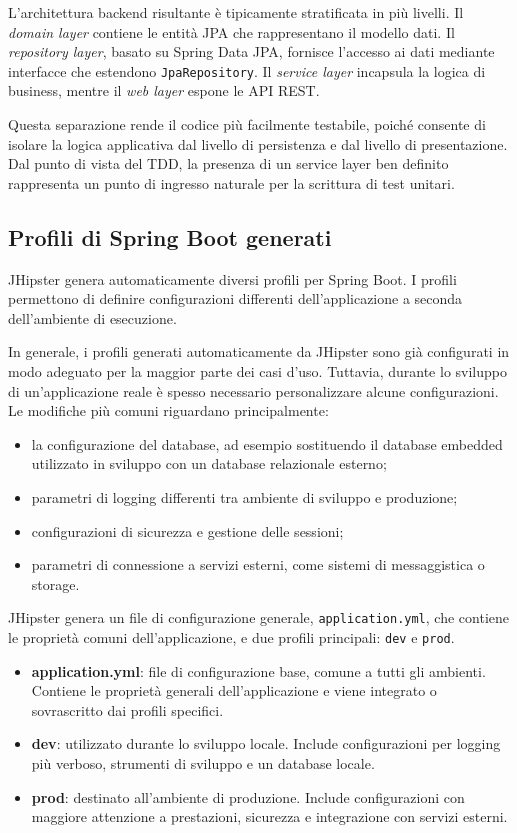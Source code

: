 L’architettura backend risultante è tipicamente stratificata in più livelli. Il \textit{domain layer} contiene le entità JPA che rappresentano il modello dati. Il \textit{repository layer}, basato su Spring Data JPA, fornisce l’accesso ai dati mediante interfacce che estendono \texttt{JpaRepository}. Il \textit{service layer} incapsula la logica di business, mentre il \textit{web layer} espone le API REST.

Questa separazione rende il codice più facilmente testabile, poiché consente di isolare la logica applicativa dal livello di persistenza e dal livello di presentazione. Dal punto di vista del TDD, la presenza di un service layer ben definito rappresenta un punto di ingresso naturale per la scrittura di test unitari.

\subsection{Profili di Spring Boot generati}
JHipster genera automaticamente diversi profili per Spring Boot. I profili permettono di definire configurazioni differenti dell’applicazione a seconda dell’ambiente di esecuzione.

In generale, i profili generati automaticamente da JHipster sono già configurati in modo adeguato per la maggior parte dei casi d’uso. Tuttavia, durante lo sviluppo di un’applicazione reale è spesso necessario personalizzare alcune configurazioni. Le modifiche più comuni riguardano principalmente:

\begin{itemize}
	\item la configurazione del database, ad esempio sostituendo il database embedded utilizzato in sviluppo con un database relazionale esterno;
	\item parametri di logging differenti tra ambiente di sviluppo e produzione;
	\item configurazioni di sicurezza e gestione delle sessioni;
	\item parametri di connessione a servizi esterni, come sistemi di messaggistica o storage.
\end{itemize}

JHipster genera un file di configurazione generale, \texttt{application.yml}, che contiene le proprietà comuni dell’applicazione, e due profili principali: \texttt{dev} e \texttt{prod}.

\begin{itemize}
	\item \textbf{application.yml}: file di configurazione base, comune a tutti gli ambienti. Contiene le proprietà generali dell’applicazione e viene integrato o sovrascritto dai profili specifici.
	
	\item \textbf{dev}: utilizzato durante lo sviluppo locale. Include configurazioni per logging più verboso, strumenti di sviluppo e un database locale.
	
	\item \textbf{prod}: destinato all’ambiente di produzione. Include configurazioni con maggiore attenzione a prestazioni, sicurezza e integrazione con servizi esterni.
\end{itemize}

